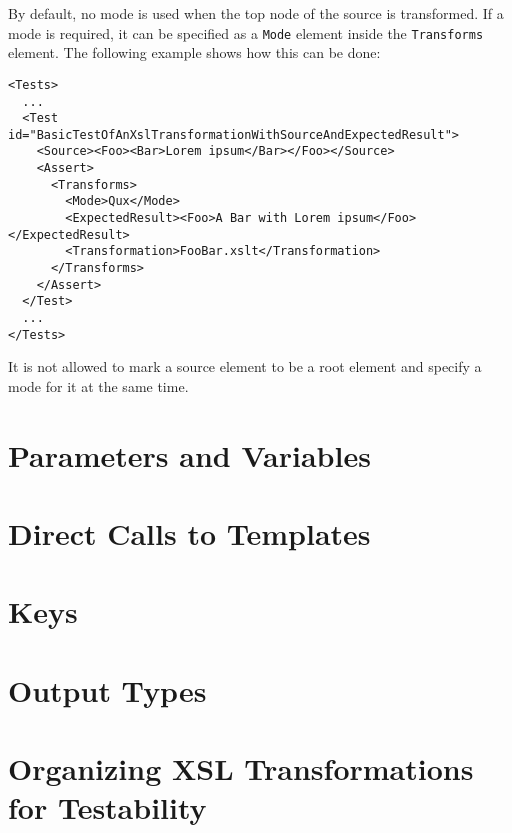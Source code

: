 By default, no mode is used when the top node of the source is transformed. If a mode is required, it can be specified as a {\tt Mode} element inside the {\tt Transforms} element. The following example shows how this can be done:
\begin{verbatim}
<Tests>
  ...
  <Test id="BasicTestOfAnXslTransformationWithSourceAndExpectedResult">
    <Source><Foo><Bar>Lorem ipsum</Bar></Foo></Source>
    <Assert>
      <Transforms>
        <Mode>Qux</Mode>
        <ExpectedResult><Foo>A Bar with Lorem ipsum</Foo></ExpectedResult>
        <Transformation>FooBar.xslt</Transformation>
      </Transforms>
    </Assert>    
  </Test>
  ...
</Tests>
\end{verbatim}

It is not allowed to mark a source element to be a root element and specify a mode for it at the same time.

\section{Parameters and Variables}

\section{Direct Calls to Templates}

\section{Keys}

\section{Output Types}

\section{Organizing XSL Transformations for Testability}
